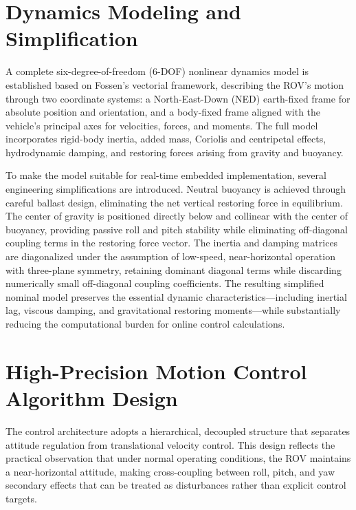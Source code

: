 \begin{digest}
\section{Dynamics Modeling and Simplification}

A complete six-degree-of-freedom (6-DOF) nonlinear dynamics model is established based on Fossen's vectorial framework, describing the ROV's motion through two coordinate systems: a North-East-Down (NED) earth-fixed frame for absolute position and orientation, and a body-fixed frame aligned with the vehicle's principal axes for velocities, forces, and moments. The full model incorporates rigid-body inertia, added mass, Coriolis and centripetal effects, hydrodynamic damping, and restoring forces arising from gravity and buoyancy.

To make the model suitable for real-time embedded implementation, several engineering simplifications are introduced. Neutral buoyancy is achieved through careful ballast design, eliminating the net vertical restoring force in equilibrium. The center of gravity is positioned directly below and collinear with the center of buoyancy, providing passive roll and pitch stability while eliminating off-diagonal coupling terms in the restoring force vector. The inertia and damping matrices are diagonalized under the assumption of low-speed, near-horizontal operation with three-plane symmetry, retaining dominant diagonal terms while discarding numerically small off-diagonal coupling coefficients. The resulting simplified nominal model preserves the essential dynamic characteristics---including inertial lag, viscous damping, and gravitational restoring moments---while substantially reducing the computational burden for online control calculations.

\section{High-Precision Motion Control Algorithm Design}

The control architecture adopts a hierarchical, decoupled structure that separates attitude regulation from translational velocity control. This design reflects the practical observation that under normal operating conditions, the ROV maintains a near-horizontal attitude, making cross-coupling between roll, pitch, and yaw secondary effects that can be treated as disturbances rather than explicit control targets.


\end{digest}
